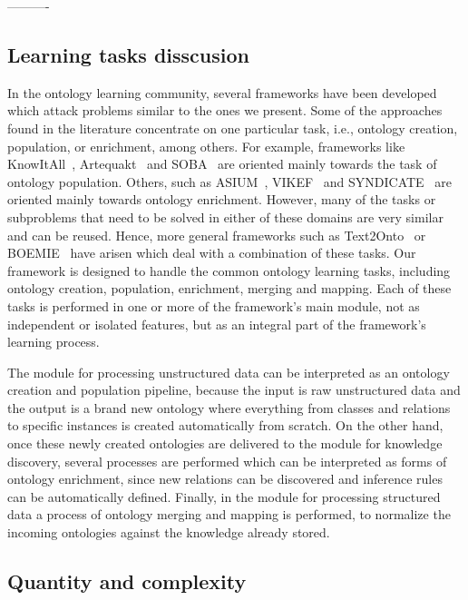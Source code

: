 ----------
    \subsection{Learning tasks disscusion}

In the ontology learning community, several frameworks have been developed which attack problems
similar to the ones we present. Some of the approaches found in the literature concentrate on one
particular task, i.e., ontology creation, population, or enrichment, among others. For example,
frameworks like KnowItAll~\cite{knowitall}, Artequakt~\cite{artequakt} and SOBA~\cite{soba} are oriented mainly towards the task of ontology
population. Others, such as ASIUM~\cite{asium}, VIKEF~\cite{vikef} and SYNDICATE~\cite{syndikate} are oriented mainly towards ontology enrichment.
However, many of the tasks or subproblems that need to be solved in either of these domains are
very similar and can be reused. Hence, more general frameworks such as Text2Onto~\cite{cimiano2005text2onto} or BOEMIE~\cite{boemie} have
arisen which deal with a combination of these tasks.
Our framework is designed to handle the common ontology learning tasks,
including ontology creation, population, enrichment, merging and mapping.
Each of these tasks is performed in one or more of the framework's main module,
not as independent or isolated features,
but as an integral part of the framework's learning process.

The module for processing unstructured data can be interpreted as an ontology
creation and population pipeline, because the input is raw unstructured data and the output is
a brand new ontology where everything from classes and relations to specific instances is
created automatically from scratch.
On the other hand, once these newly created ontologies are delivered to the module for knowledge
discovery, several processes are performed which can be interpreted as forms of ontology
enrichment, since new relations can be discovered and inference rules can be automatically defined.
Finally, in the module for processing structured data a process of ontology merging and mapping is
performed, to normalize the incoming ontologies against the knowledge already stored.

\subsection{Quantity and complexity}

